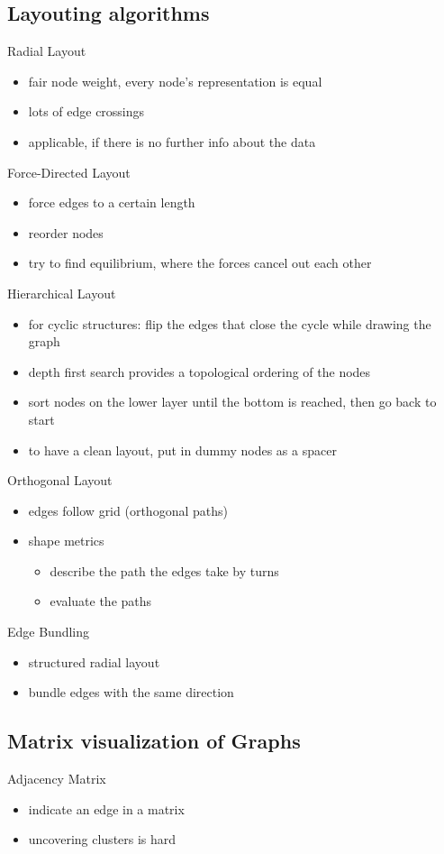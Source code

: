 \documentclass[10pt,a4paper]{article}
\begin{document}
	\subsection{Layouting algorithms}
		Radial Layout
		\begin{itemize}
			\item fair node weight, every node's representation is equal
			\item lots of edge crossings
			\item applicable, if there is no further info about the data
		\end{itemize}
		Force-Directed Layout
		\begin{itemize}
			\item force edges to a certain length
			\item reorder nodes
			\item try to find equilibrium, where the forces cancel out each other
		\end{itemize}
		Hierarchical Layout
		\begin{itemize}
			\item for cyclic structures: flip the edges that close the cycle while drawing the graph
			\item depth first search provides a topological ordering of the nodes
			\item sort nodes on the lower layer until the bottom is reached, then go back to start
			\item to have a clean layout, put in dummy nodes as a spacer
		\end{itemize}
		Orthogonal Layout
		\begin{itemize}
			\item edges follow grid (orthogonal paths)
			\item shape metrics
			\begin{itemize}
				\item describe the path the edges take by turns
				\item evaluate the paths 
			\end{itemize}
		\end{itemize}
		Edge Bundling
		\begin{itemize}
			\item structured radial layout
			\item bundle edges with the same direction
		\end{itemize}

	\subsection{Matrix visualization of Graphs}
		Adjacency Matrix
		\begin{itemize}
			\item indicate an edge in a matrix
			\item uncovering clusters is hard
		\end{itemize}
	
\end{document}
